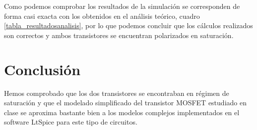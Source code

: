 \documentclass[11pt,a4paper]{article}
\begin{document}
		Como podemos comprobar los resultados de la simulación se corresponden de forma casi exacta con los obtenidos en el análisis teórico, cuadro \ref{tabla_resultadosanalisis}, por lo que podemos concluir que los cálculos realizados son correctos y ambos transistores se encuentran polarizados en saturación.

\section{Conclusión}

	Hemos comprobado que los dos transistores se encontraban en régimen de saturación y que el modelado simplificado del transistor MOSFET estudiado en clase se aproxima bastante bien a los modelos complejos implementados en el software LtSpice para este tipo de circuitos.
\end{document}
